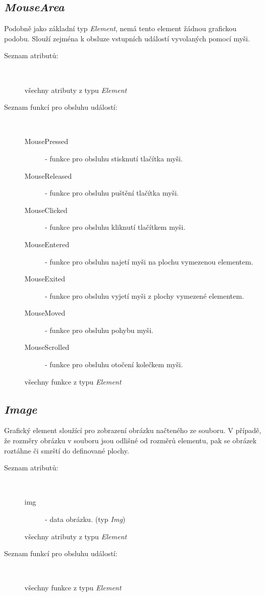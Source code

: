 \documentclass[11pt,twoside,a4paper]{book}
\begin{document}
\subsection{\textit{MouseArea}}
Podobně jako základní typ \textit{Element}, nemá tento element žádnou grafickou podobu. Slouží zejména k obsluze vstupních událostí vyvolaných pomocí myši.\\
\begin{description}
\item[Seznam atributů:] ~
\begin{description}
\item[všechny atributy z typu \textit{Element}]
\end{description}
\item[Seznam funkcí pro obsluhu událostí:] ~
\begin{description}
\item[MousePressed] - funkce pro obsluhu stisknutí tlačítka myši.
\item[MouseReleased] - funkce pro obsluhu puštění tlačítka myši.
\item[MouseClicked] - funkce pro obsluhu kliknutí tlačítkem myši.
\item[MouseEntered] - funkce pro obsluhu najetí myši na plochu vymezenou elementem.
\item[MouseExited] - funkce pro obsluhu vyjetí myši z plochy vymezené elementem.
\item[MouseMoved] - funkce pro obsluhu pohybu myši.
\item[MouseScrolled] - funkce pro obsluhu otočení kolečkem myši.
\item[všechny funkce z typu \textit{Element}]
\end{description}
\end{description}

\subsection{\textit{Image}}
Grafický element sloužící pro zobrazení obrázku načteného ze souboru. V případě, že rozměry obrázku v souboru jsou odlišné od rozměrů elementu, pak se obrázek roztáhne či smrští do definované plochy.\\
\begin{description}
\item[Seznam atributů:] ~
\begin{description}
\item[img] - data obrázku. (typ \textit{Img})
\item[všechny atributy z typu \textit{Element}]
\end{description}
\item[Seznam funkcí pro obsluhu událostí:] ~
\begin{description}
\item[všechny funkce z typu \textit{Element}]
\end{description}
\end{description}
\end{document}
